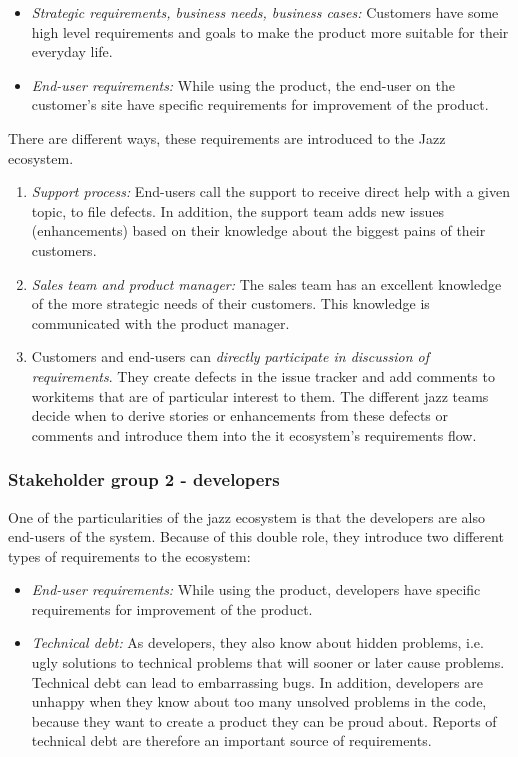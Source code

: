 \begin{itemize}
    \item \emph{Strategic requirements, business needs, business cases:} Customers have some high level requirements and goals to make the product more suitable for their everyday life.
    \item \emph{End-user requirements: }While using the product, the end-user on  the customer's site have specific requirements for improvement of the product.
\end{itemize}

There are different ways, these requirements are introduced to the Jazz ecosystem.
\begin{enumerate}
    \item \emph{Support process:} End-users call the support to receive direct help with a given topic, to file defects. 
    In addition, the support team adds new issues (enhancements) based on their knowledge about the biggest pains of their customers.
    \item \emph{Sales team and product manager:} The sales team has an excellent knowledge of the more strategic needs of their customers. This knowledge is communicated with the product manager.
    \item Customers and end-users can \emph{directly participate in discussion of requirements}. 
    They create defects in the issue tracker and add comments to workitems that are of particular interest to them. 
    The different jazz teams decide when to derive stories or enhancements from these defects or comments and introduce them into the it ecosystem's requirements flow.
\end{enumerate}


\subsubsection{Stakeholder group 2 - developers}

One of the particularities of the jazz ecosystem is that the developers are also end-users of the system. Because of this double role, they introduce two different types of requirements to the ecosystem:
\begin{itemize}
    \item \emph{End-user requirements:} While using the product, developers have specific requirements for improvement of the product.
    \item \emph{Technical debt:} As developers, they also know about hidden problems, i.e. ugly solutions to technical problems that will sooner or later cause problems. 
    Technical debt can lead to embarrassing bugs. 
    In addition, developers are unhappy when they know about too many unsolved problems in the code, because they want to create a product they can be proud about. 
    Reports of technical debt are therefore an important source of requirements.
\end{itemize}

